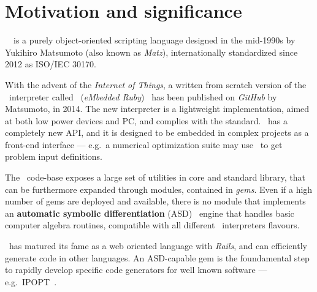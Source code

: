 
\section{Motivation and significance}
\label{sec:motivation}

\Ruby~\cite{flanagan2008ruby}~is a purely object-oriented scripting language designed in the mid-1990s by Yukihiro Matsumoto (also known as \emph{Matz}), internationally standardized since 2012 as ISO/IEC 30170.

With the advent of the \emph{Internet of Things}, a written from scratch version of the \Ruby~interpreter called \Mruby~(\emph{eMbedded Ruby})~\cite{tanaka2015mruby} has been published on \emph{GitHub} by Matsumoto, in 2014. The new interpreter is a lightweight implementation, aimed at both low power devices and PC, and complies with the standard\cite{iso30170}. \Mruby~has a completely new API, and it is designed to be embedded in complex projects as a front-end interface --- e.g.\ a numerical optimization suite may use \Mruby~to get problem input definitions.

The \Ruby~code-base exposes a large set of utilities in core and standard library, that can be furthermore expanded through modules, contained in \emph{gems}. Even if a high number of gems are deployed and available, there is no module that implements an \textbf{automatic symbolic differentiation} (ASD)~\cite{tolsma1998computational} engine that handles basic computer algebra routines, compatible with all different \Ruby~interpreters flavours.

\Ruby~has matured its fame as a web oriented language with \emph{Rails}, and can efficiently generate code in other languages. An ASD-capable gem is the foundamental step to rapidly develop specific code generators for well known software --- e.g.\ IPOPT~\cite{wachter2009ipopt, wachter2006}\@.

